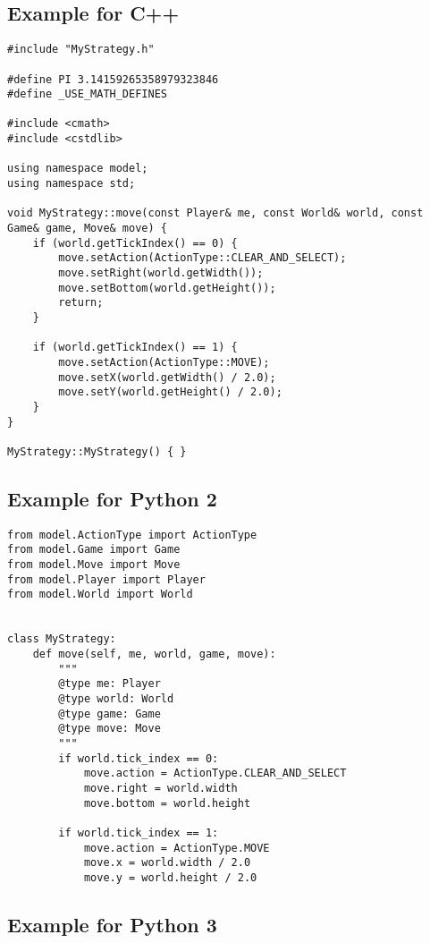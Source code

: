 \newpage
\subsection{Example for C++}

\begin{verbatim}
#include "MyStrategy.h"

#define PI 3.14159265358979323846
#define _USE_MATH_DEFINES

#include <cmath>
#include <cstdlib>

using namespace model;
using namespace std;

void MyStrategy::move(const Player& me, const World& world, const Game& game, Move& move) {
    if (world.getTickIndex() == 0) {
        move.setAction(ActionType::CLEAR_AND_SELECT);
        move.setRight(world.getWidth());
        move.setBottom(world.getHeight());
        return;
    }

    if (world.getTickIndex() == 1) {
        move.setAction(ActionType::MOVE);
        move.setX(world.getWidth() / 2.0);
        move.setY(world.getHeight() / 2.0);
    }
}

MyStrategy::MyStrategy() { }
\end{verbatim}

\newpage
\subsection{Example for Python 2}

\begin{verbatim}
from model.ActionType import ActionType
from model.Game import Game
from model.Move import Move
from model.Player import Player
from model.World import World


class MyStrategy:
    def move(self, me, world, game, move):
        """
        @type me: Player
        @type world: World
        @type game: Game
        @type move: Move
        """
        if world.tick_index == 0:
            move.action = ActionType.CLEAR_AND_SELECT
            move.right = world.width
            move.bottom = world.height

        if world.tick_index == 1:
            move.action = ActionType.MOVE
            move.x = world.width / 2.0
            move.y = world.height / 2.0
\end{verbatim}

\subsection{Example for Python 3}

